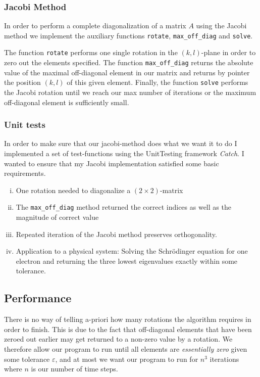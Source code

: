 \documentclass[a4paper, 10pt]{amsart}
\newcommand{\mline}[1]{\texttt{#1}}
\begin{document}
\subsubsection{Jacobi Method}
\label{ssub:jacobi_method}

In order to perform a complete diagonalization of a matrix $A$ using the Jacobi
method we implement the  auxiliary functions \mline{rotate},
\mline{max_off_diag} and \mline{solve}.

The function \mline{rotate} performs one single rotation in the $(k, l)$-plane
in order to zero out the elements specified. The function \mline{max_off_diag}
returns the absolute value of the maximal off-diagonal element in our matrix
and returns by pointer the position $(k, l)$ of this given element.  Finally,
the function \mline{solve} performs the Jacobi rotation until we reach our max
number of iterations or the maximum off-diagonal element is sufficiently small.

\subsubsection{Unit tests}
\label{ssub:unittest}

In order to make sure that our jacobi-method does what we want it to do I
implemented a set of test-functions using the UnitTesting framework
\emph{Catch}. I wanted to ensure that my Jacobi implementation satisfied some
basic requirements.

\begin{enumerate}[i)]
  \item One rotation needed to diagonalize a $(2\times2)$-matrix
  \item The \mline{max_off_diag} method returned the correct indices as well as
    the magnitude of correct value
  \item Repeated iteration of the Jacobi method preserves orthogonality.
  \item Application to a physical system: Solving the Schr\"odinger equation for one electron and
    returning the three lowest eigenvalues exactly within some tolerance.
\end{enumerate}

\subsection{Performance}
\label{sec:performance}

There is no way of telling a-priori how many rotations the algorithm requires
in order to finish.  This is due to the fact that off-diagonal elements that
have been zeroed out earlier may get returned to a non-zero value by a
rotation. We therefore allow our program to run until all elements are
\emph{essentially zero} given some tolerance $\varepsilon$, and at most we want our program
to run for $n^3$ iterations where $n$ is our number of time steps.
\end{document}

